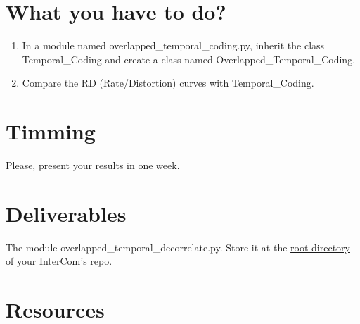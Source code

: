 
\section{What you have to do?}

\begin{enumerate}
\item In a module named overlapped\_temporal\_coding.py, inherit
  the class Temporal\_Coding and create a class named
  Overlapped\_Temporal\_Coding.
\item Compare the RD (Rate/Distortion) curves with Temporal\_Coding.
\end{enumerate}

\section{Timming}

Please, present your results in one week.

\section{Deliverables}

The module overlapped\_temporal\_decorrelate.py. Store it at the
\href{https://github.com/Tecnologias-multimedia/intercom}{root
  directory} of your InterCom's repo.

\section{Resources}


